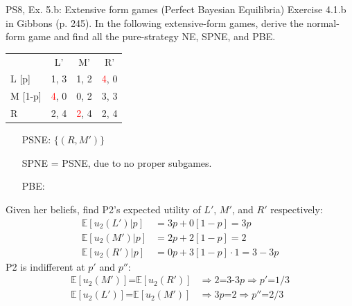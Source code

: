 \begin{frame}{PS8, Ex. 5.b: Extensive form games (Perfect Bayesian Equilibria)}
    Exercise 4.1.b in Gibbons (p. 245). In the following extensive-form games, derive the normal-form game and find all the pure-strategy NE, SPNE, and PBE.
    \vspace{-10pt}
    \begin{multicols}{2}
      \begin{table}
        \begin{tabular}{l|c|c|c|}
          \multicolumn{1}{c}{} & \multicolumn{1}{c}{L'} & \multicolumn{1}{c}{M'} & \multicolumn{1}{c}{R'} \\\cline{2-4}
          L [p]   & 1, \color{blue}3 & 1, 2 & \textcolor{red}{4}, 0 \\\cline{2-4}
          M [1-p] & \textcolor{red}{4}, 0 & 0, 2 & 3, \color{blue}3 \\\cline{2-4}
          R       & 2, \color{blue}4 & \textcolor{red}{2}, \color{blue}4 & 2, \color{blue}4 \\\cline{2-4}
        \end{tabular}
      \end{table} \vspace{-8pt}
      \begin{itemize}
        \item[PSNE:] $\{(R,M')\}$
        \item[SPNE =] PSNE, due to no proper subgames.
        \item[PBE:]
      \end{itemize} \vspace{-6pt}
      Given her beliefs, find P2's expected utility of $L'$, $M'$, and $R'$ respectively: \vspace{-6pt}
      \begin{align*}
        \mathbb{E}[u_2(L')|p]&=3p+0[1-p]=3p\\ \mathbb{E}[u_2(M')|p]&=2p+2[1-p]=2\\
        \mathbb{E}[u_2(R')|p]&=0p+3[1-p]\cdot1=3-3p
      \end{align*}
      P2 is indifferent at $p'$ and $p''$: \vspace{-6pt}
      \begin{align*}
        \mathbb{E}[u_2(M')]\text{=}\mathbb{E}[u_2(R')]&\Rightarrow 2\text{=3-3}p\Rightarrow p'\text{=}1/3\\
        \mathbb{E}[u_2(L')]\text{=}\mathbb{E}[u_2(M')]&\Rightarrow 3p\text{=}2\Rightarrow p''\text{=}2/3
      \end{align*}

\end{multicols}
\end{frame}
